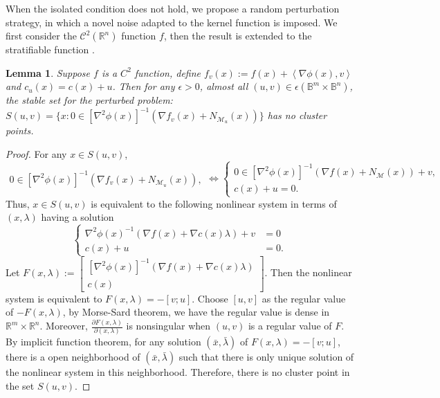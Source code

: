 \documentclass[11pt]{article}
\newcommand{\R}{\mathbb R}
\newcommand{\cC}{\mathcal C}
\def\inner#1{\left\langle#1\right\rangle}
\newtheorem{lemma}{Lemma}[section]
\begin{document}
When the isolated condition does not hold, we propose a random perturbation strategy, in which a novel noise adapted to the kernel function is imposed. We first consider the $\cC^2(\R^n)$ function $f$, then the result is extended to the stratifiable function \cite{bolte2007clarke,davis2020stochastic}.
\begin{lemma}
\label{le:perturb}
Suppose $f$ is a $C^2$ function, define $f_v(x):=f(x)+\inner{\nabla\phi(x),v}$ and $c_u(x)=c(x)+u$. Then for any $\epsilon>0$, almost all $(u,v)\in\epsilon(\mathbb{B}^m\times\mathbb{B}^n)$, the stable set for the perturbed problem: $S(u,v)=\{x:0\in [\nabla^2\phi(x)]^{-1} (\nabla f_v(x)+N_{\mathcal{M}_u}(x))\}$ has no cluster points. 
\end{lemma}
\begin{proof}
For any $x\in S(u,v)$, 
\[
\begin{aligned}
0\in [\nabla^2\phi(x)]^{-1}  (\nabla f_v(x)+N_{\mathcal{M}_u}(x)),
\end{aligned}
\Longleftrightarrow 
\left\{
\begin{aligned}
0\in [\nabla^2\phi(x)]^{-1}  (\nabla f(x)+N_{\mathcal{M}}(x))+v,\\
c(x)+u=0.
\end{aligned}
\right.
\]
Thus, $x\in S(u,v)$ is equivalent to the following nonlinear system in terms of $(x,\lambda)$ having a solution 
\[
\left\{
\begin{aligned}
\nabla^2\phi(x)^{-1}  (\nabla f(x)+\nabla c(x)\lambda)+v&=0\\
c(x)+u&=0.
\end{aligned}
\right.
\]
Let $F(x,\lambda):=\left[
\begin{array}{c}
   [\nabla^2\phi(x)]^{-1} (\nabla f(x)+\nabla c(x)\lambda)  \\
   c(x)  
\end{array}
\right]$. Then the nonlinear system is equivalent to $F(x,\lambda)=-[v;u]$. Choose $[u,v]$ as the regular value of $-F(x,\lambda)$, by Morse-Sard theorem, we have the regular value is dense in $\R^{m}\times\R^n$. Moreover, $\frac{\partial F(x,\lambda)}{\partial (x,\lambda)}$ is nonsingular when $(u,v)$ is a regular value of $F$. By implicit function theorem, for any solution $(\bar x,\bar\lambda)$ of $F(x,\lambda)=-[v;u]$, there is a open neighborhood of $(\bar x,\bar\lambda)$ such that there is only unique solution of the nonlinear system in this neighborhood. Therefore, there is no cluster point in the set $S(u,v)$.
\end{proof}
\end{document}
